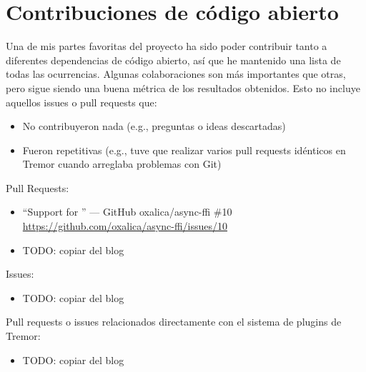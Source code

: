 \chapter{Contribuciones de código abierto}\label{annex:contributions}

\newcommand{\issue}[3] {
    \item ``#3'' --- GitHub #1 \#10\\
        \url{https://github.com/#1/issues/#2}
}
\newcommand{\pr}[3] {
    \item ``#3'' --- GitHub #1\\
        \url{https://github.com/#1/pull/#2}
}


Una de mis partes favoritas del proyecto ha sido poder contribuir tanto a
diferentes dependencias de código abierto, así que he mantenido una lista de
todas las ocurrencias. Algunas colaboraciones son más importantes que otras,
pero sigue siendo una buena métrica de los resultados obtenidos. Esto no incluye
aquellos issues o pull requests que:

\begin{itemize}
    \item No contribuyeron nada (e.g., preguntas o ideas descartadas)

    \item Fueron repetitivas (e.g., tuve que realizar varios pull requests
        idénticos en Tremor cuando arreglaba problemas con Git)

\end{itemize}

Pull Requests:

\begin{itemize}
    \issue{oxalica/async-ffi}{10}{Support for }

    \item TODO: copiar del blog

\end{itemize}

Issues:

\begin{itemize}
    \item TODO: copiar del blog

\end{itemize}

Pull requests o issues relacionados directamente con el sistema de plugins de
Tremor:

\begin{itemize}
    \item TODO: copiar del blog

\end{itemize}

